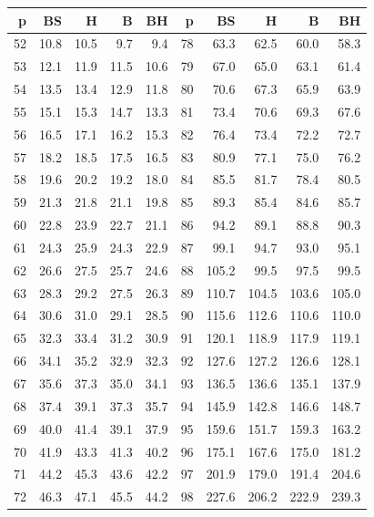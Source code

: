 \documentclass[a4paper,10pt,titlepage,oneside,openany]{book}
\theoremstyle{plain}
\theoremstyle{definition}
\theoremstyle{remark}
\begin{document}
\begin{table}[p]
\centering
\fontsize{7.4}{8.4}\selectfont
\setlength{\tabcolsep}{3.2pt}
\begin{tabular}{@{}rrrrr@{\hspace{8mm}}rrrrr@{}}
\toprule
p & BS & H & B & BH & p & BS & H & B & BH \\
\midrule
52 & 10.8 & 10.5 & 9.7 & 9.4 & 78 & 63.3 & 62.5 & 60.0 & 58.3 \\
53 & 12.1 & 11.9 & 11.5 & 10.6 & 79 & 67.0 & 65.0 & 63.1 & 61.4 \\
54 & 13.5 & 13.4 & 12.9 & 11.8 & 80 & 70.6 & 67.3 & 65.9 & 63.9 \\
55 & 15.1 & 15.3 & 14.7 & 13.3 & 81 & 73.4 & 70.6 & 69.3 & 67.6 \\
56 & 16.5 & 17.1 & 16.2 & 15.3 & 82 & 76.4 & 73.4 & 72.2 & 72.7 \\
57 & 18.2 & 18.5 & 17.5 & 16.5 & 83 & 80.9 & 77.1 & 75.0 & 76.2 \\
58 & 19.6 & 20.2 & 19.2 & 18.0 & 84 & 85.5 & 81.7 & 78.4 & 80.5 \\
59 & 21.3 & 21.8 & 21.1 & 19.8 & 85 & 89.3 & 85.4 & 84.6 & 85.7 \\
60 & 22.8 & 23.9 & 22.7 & 21.1 & 86 & 94.2 & 89.1 & 88.8 & 90.3 \\
61 & 24.3 & 25.9 & 24.3 & 22.9 & 87 & 99.1 & 94.7 & 93.0 & 95.1 \\
62 & 26.6 & 27.5 & 25.7 & 24.6 & 88 & 105.2 & 99.5 & 97.5 & 99.5 \\
63 & 28.3 & 29.2 & 27.5 & 26.3 & 89 & 110.7 & 104.5 & 103.6 & 105.0 \\
64 & 30.6 & 31.0 & 29.1 & 28.5 & 90 & 115.6 & 112.6 & 110.6 & 110.0 \\
65 & 32.3 & 33.4 & 31.2 & 30.9 & 91 & 120.1 & 118.9 & 117.9 & 119.1 \\
66 & 34.1 & 35.2 & 32.9 & 32.3 & 92 & 127.6 & 127.2 & 126.6 & 128.1 \\
67 & 35.6 & 37.3 & 35.0 & 34.1 & 93 & 136.5 & 136.6 & 135.1 & 137.9 \\
68 & 37.4 & 39.1 & 37.3 & 35.7 & 94 & 145.9 & 142.8 & 146.6 & 148.7 \\
69 & 40.0 & 41.4 & 39.1 & 37.9 & 95 & 159.6 & 151.7 & 159.3 & 163.2 \\
70 & 41.9 & 43.3 & 41.3 & 40.2 & 96 & 175.1 & 167.6 & 175.0 & 181.2 \\
71 & 44.2 & 45.3 & 43.6 & 42.2 & 97 & 201.9 & 179.0 & 191.4 & 204.6 \\
72 & 46.3 & 47.1 & 45.5 & 44.2 & 98 & 227.6 & 206.2 & 222.9 & 239.3 \\

\end{tabular}
\end{table}
\end{document}
